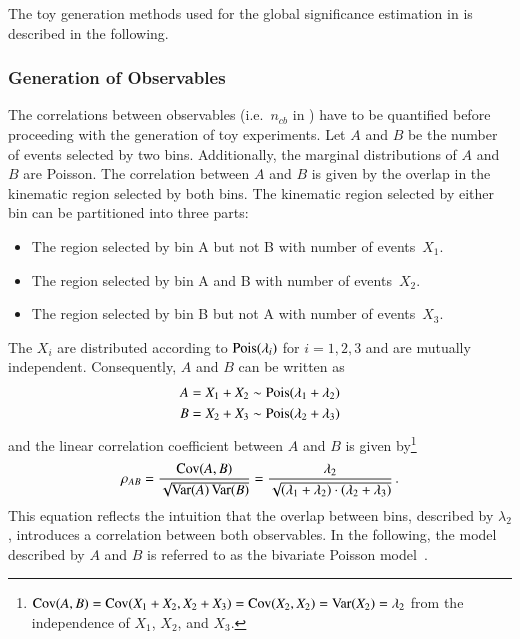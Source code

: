 The toy generation methods used for the global significance estimation in
 is described in the following.


\subsubsection{Generation of Observables}

The correlations between observables (i.e.~$n_{cb}$ in
) have to be quantified before proceeding with
the generation of toy experiments. Let $A$ and $B$ be the number of events
selected by two bins. Additionally, the marginal distributions of $A$ and $B$
are Poisson. The correlation between $A$ and $B$ is given by the overlap in the
kinematic region selected by both bins. The kinematic region selected by either
bin can be partitioned into three parts:
\begin{itemize}

\item The region selected by bin A but not B with number of
  events~$X_1$.

\item The region selected by bin A and B with number of events~$X_2$.

\item The region selected by bin B but not A with number of events~$X_3$.

\end{itemize}
The $X_i$ are distributed according to $\operatorname{Pois}(\lambda_i)$ for $i = 1, 2, 3$ and
are mutually independent. Consequently, $A$ and $B$ can be written as
\begin{align*}
  A &= X_1 + X_2 \sim \operatorname{Pois}(\lambda_1 + \lambda_2) \\
  B &= X_2 + X_3 \sim \operatorname{Pois}(\lambda_2 + \lambda_3)
\end{align*}
and the linear correlation coefficient between $A$ and $B$ is given
by\footnote{$\operatorname{Cov}(A,B) = \operatorname{Cov}(X_1 + X_2, X_2 + X_3) = \operatorname{Cov}(X_2, X_2) = \operatorname{Var}(X_2)
  = \lambda_2$ from the independence of $X_1$, $X_2$, and $X_3$.}
\begin{align*}
  \rho_{AB} = \frac{\operatorname{Cov}(A, B)}{\sqrt{\operatorname{Var}(A)\operatorname{Var}(B)}}
  = \frac{\lambda_2}{\sqrt{(\lambda_1 + \lambda_2) \cdot (\lambda_2 + \lambda_3)}} \,\text{.}
\end{align*}
This equation reflects the intuition that the overlap between bins, described by
$\lambda_2$, introduces a correlation between both observables. In the
following, the model described by $A$ and $B$ is referred to as the bivariate
Poisson model~\cite{teicher1954}.

